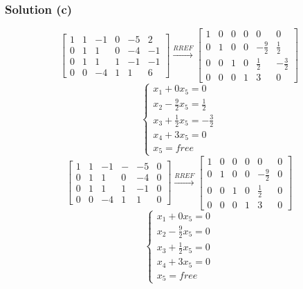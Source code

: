 \documentclass[12pt]{article}
\begin{document}
\subsubsection*{Solution (c)}
\[
  \begin{bmatrix}
    1 & 1 & -1 & 0 & -5 & 2\\ 
    0 & 1 & 1 & 0 & -4 & -1\\ 
    0 & 1 & 1 & 1 & -1 & -1\\ 
    0 & 0 & -4 & 1 & 1 & 6 
  \end{bmatrix}
  \overset{RREF}{\longrightarrow}
  \begin{bmatrix}
    1 & 0 & 0 & 0 & 0 & 0\\ 
    0 & 1 & 0 & 0 & -\frac{9}{2} & \frac{1}{2}\\ 
    0 & 0 & 1 & 0 & \frac{1}{2} & -\frac{3}{2}\\ 
    0 & 0 & 0 & 1 & 3 & 0 
  \end{bmatrix}
\]
\begin{equation*}
  \begin{cases}
    x_1 + 0x_5 = 0\\ 
    x_2 - \frac{9}{2}x_5 = \frac{1}{2}\\ 
    x_3 + \frac{1}{2}x_5 = -\frac{3}{2}\\ 
    x_4 + 3x_5 = 0\\ 
    x_5 = free
  \end{cases}
\end{equation*}
\[
  \begin{bmatrix}
    1 & 1 & -1 & - & -5 & 0\\ 
    0 & 1 & 1 & 0 & -4 & 0\\ 
    0 & 1 & 1 & 1 & -1 & 0\\ 
    0 & 0 & -4 & 1 & 1 & 0 
  \end{bmatrix}
  \overset{RREF}{\longrightarrow}
  \begin{bmatrix}
    1 & 0 & 0 & 0 & 0 & 0\\ 
    0 & 1 & 0 & 0 & -\frac{9}{2} & 0\\ 
    0 & 0 & 1 & 0 & \frac{1}{2} & 0\\ 
    0 & 0 & 0 & 1 & 3 & 0 
  \end{bmatrix}
\]
\begin{equation*}
  \begin{cases}
    x_1 + 0x_5 = 0\\ 
    x_2 - \frac{9}{2}x_5 = 0\\ 
    x_3 + \frac{1}{2}x_5 = 0\\ 
    x_4 + 3x_5 = 0\\ 
    x_5 = free
  \end{cases}
\end{equation*}
\end{document}
